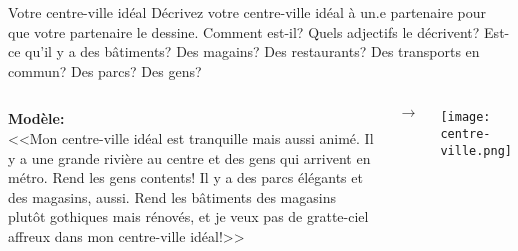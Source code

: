 \begin{frame}{Votre centre-ville idéal}
  \small
  Décrivez votre centre-ville idéal à un.e partenaire pour que votre partenaire le dessine.
  Comment est-il?
  Quels adjectifs le décrivent?
  Est-ce qu'il y a des bâtiments?
  Des magains?
  Des restaurants?
  Des transports en commun?
  Des parcs?
  Des gens?
  \vspace{0.15cm}
  \begin{columns}
    \footnotesize
      \textbf{Modèle:} \\
      <<Mon centre-ville idéal est tranquille mais aussi animé. Il y a une grande rivière au centre et des gens qui arrivent en métro. \alert{Rend} les gens contents! Il y a des parcs élégants et des magasins, aussi. \alert{Rend} les bâtiments des magasins plutôt gothiques mais rénovés, et je veux pas de gratte-ciel affreux dans mon centre-ville idéal!>>
      \begin{center}
        $\to$
      \end{center}
      \begin{center}
        \texttt{[image: centre-ville.png]} \\
        \vspace{0.75cm}
      \end{center}
  \end{columns}
\end{frame}